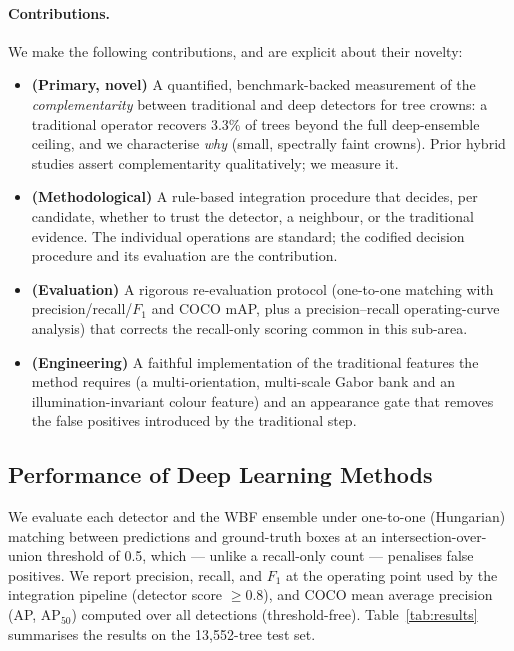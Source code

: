 \paragraph{Contributions.} We make the following contributions, and are
explicit about their novelty:
\begin{itemize}
  \item \textbf{(Primary, novel)} A quantified, benchmark-backed measurement of
  the \emph{complementarity} between traditional and deep detectors for tree
  crowns: a traditional operator recovers 3.3\% of trees beyond the full
  deep-ensemble ceiling, and we characterise \emph{why} (small, spectrally
  faint crowns). Prior hybrid studies assert complementarity qualitatively;
  we measure it.
  \item \textbf{(Methodological)} A rule-based integration procedure that
  decides, per candidate, whether to trust the detector, a neighbour, or the
  traditional evidence. The individual operations are standard; the codified
  decision procedure and its evaluation are the contribution.
  \item \textbf{(Evaluation)} A rigorous re-evaluation protocol
  (one-to-one matching with precision/recall/$F_1$ and COCO mAP, plus a
  precision--recall operating-curve analysis) that corrects the recall-only
  scoring common in this sub-area.
  \item \textbf{(Engineering)} A faithful implementation of the traditional
  features the method requires (a multi-orientation, multi-scale Gabor bank and
  an illumination-invariant colour feature) and an appearance gate that removes
  the false positives introduced by the traditional step.
\end{itemize}


\subsection{Performance of Deep Learning Methods}

We evaluate each detector and the WBF ensemble under one-to-one (Hungarian)
matching between predictions and ground-truth boxes at an intersection-over-union
threshold of 0.5, which --- unlike a recall-only count --- penalises false
positives. We report precision, recall, and $F_1$ at the operating point used by
the integration pipeline (detector score $\geq 0.8$), and COCO mean average
precision (AP, AP$_{50}$) computed over all detections (threshold-free).
Table~\ref{tab:results} summarises the results on the 13{,}552-tree test set.

